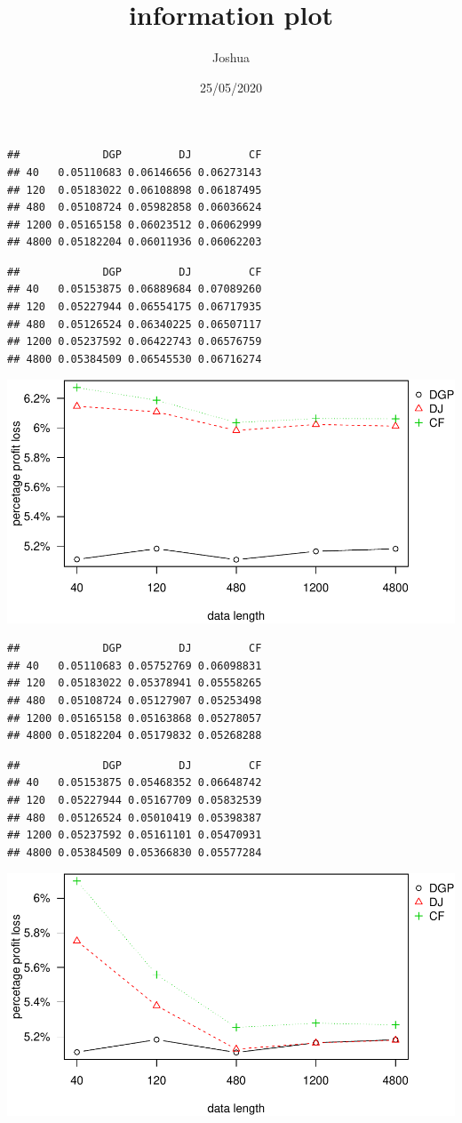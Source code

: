 \documentclass[
]{article}
\title{information plot}
\author{Joshua}
\date{25/05/2020}
\begin{document}
\maketitle

\begin{verbatim}
##             DGP         DJ         CF
## 40   0.05110683 0.06146656 0.06273143
## 120  0.05183022 0.06108898 0.06187495
## 480  0.05108724 0.05982858 0.06036624
## 1200 0.05165158 0.06023512 0.06062999
## 4800 0.05182204 0.06011936 0.06062203
\end{verbatim}

\begin{verbatim}
##             DGP         DJ         CF
## 40   0.05153875 0.06889684 0.07089260
## 120  0.05227944 0.06554175 0.06717935
## 480  0.05126524 0.06340225 0.06507117
## 1200 0.05237592 0.06422743 0.06576759
## 4800 0.05384509 0.06545530 0.06716274
\end{verbatim}

\includegraphics{information-plot_files/figure-latex/AR(1)-1.pdf}

\begin{verbatim}
##             DGP         DJ         CF
## 40   0.05110683 0.05752769 0.06098831
## 120  0.05183022 0.05378941 0.05558265
## 480  0.05108724 0.05127907 0.05253498
## 1200 0.05165158 0.05163868 0.05278057
## 4800 0.05182204 0.05179832 0.05268288
\end{verbatim}

\begin{verbatim}
##             DGP         DJ         CF
## 40   0.05153875 0.05468352 0.06648742
## 120  0.05227944 0.05167709 0.05832539
## 480  0.05126524 0.05010419 0.05398387
## 1200 0.05237592 0.05161101 0.05470931
## 4800 0.05384509 0.05366830 0.05577284
\end{verbatim}

\includegraphics{information-plot_files/figure-latex/SAR(3)(1)_4-1.pdf}
\end{document}
